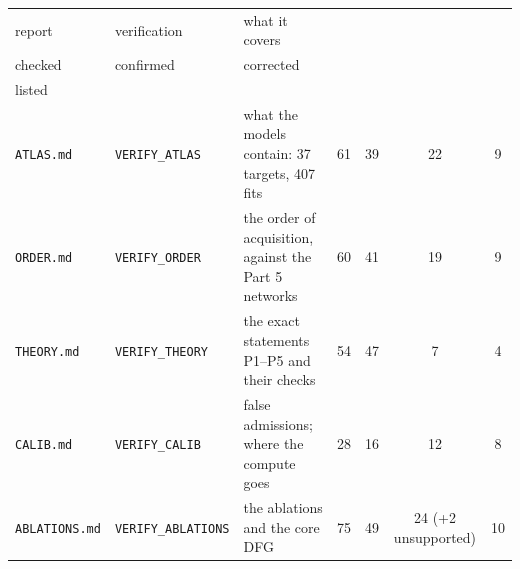\begin{tabularx}{\linewidth}{@{}ll>{\raggedright\arraybackslash}Xcccc@{}}
\toprule
report & verification & what it covers & \hd{claims\\checked} & confirmed & corrected & \hd{omissions\\listed}\\
\midrule
\texttt{ATLAS.md} & \texttt{VERIFY\_ATLAS} & what the models contain: 37 targets, 407 fits & 61 & 39 & 22 & 9\\
\texttt{ORDER.md} & \texttt{VERIFY\_ORDER} & the order of acquisition, against the Part 5 networks & 60 & 41 & 19 & 9\\
\texttt{THEORY.md} & \texttt{VERIFY\_THEORY} & the exact statements P1--P5 and their checks & 54 & 47 & 7 & 4\\
\texttt{CALIB.md} & \texttt{VERIFY\_CALIB} & false admissions; where the compute goes & 28 & 16 & 12 & 8\\
\texttt{ABLATIONS.md} & \texttt{VERIFY\_ABLATIONS} & the ablations and the core DFG & 75 & 49 & 24 (+2 unsupported) & 10\\
\bottomrule
\end{tabularx}
